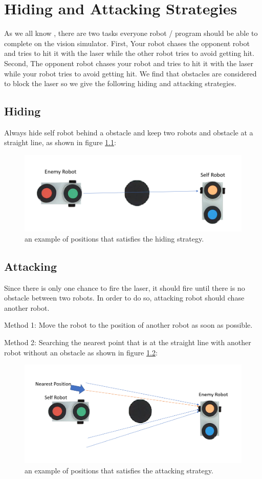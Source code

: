 \chapter{Hiding and Attacking Strategies}
\label{cha:STRATEGIES}

\renewcommand{\thepage}{\arabic{page}}
As we all know , there are two tasks everyone robot / program should be able to complete on the vision simulator. First, Your robot chases the opponent robot and tries to hit it with the laser while the other robot tries to avoid getting hit. Second, The opponent robot chases your robot and tries to hit it with the laser while your robot tries to avoid getting hit. We find that obstacles are considered to block the laser so we give the following hiding and attacking strategies. 

\section{Hiding}
Always hide self robot behind a obstacle and keep two robots and obstacle at a straight line, as shown in figure \ref{hiding_strategy}:

\begin{figure}[thb]
    \centering
    \includegraphics[width=1\textwidth]{images/hiding_strategy.png}
    \caption[hiding strategy]{an example of positions that satisfies the hiding strategy.}\label{hiding_strategy}
\end{figure}

\section{Attacking}
Since there is only one chance to fire the laser, it should fire until there is no obstacle between two robots. In order to do so, attacking robot should chase another robot. 

Method 1:
Move the robot to the position of another robot as soon as possible.

Method 2:
Searching the nearest point that is at the straight line with another robot without an obstacle as shown in figure \ref{attacking_method2}:

\begin{figure}[thb]
    \centering
    \includegraphics[width=1\textwidth]{images/attacking_method2.png}
    \caption[attacking method]{an example of positions that satisfies the attacking strategy.}\label{attacking_method2}
\end{figure}
